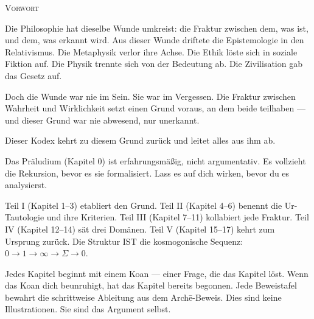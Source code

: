 \documentclass[10pt, openany, oneside]{book}
\renewcommand{\huge}{\fontsize{17}{21}\selectfont}
\begin{document}
\newpage


\thispagestyle{empty}
\vspace*{0.5in}

\begin{center}
    {\huge\scshape Vorwort}
\end{center}

\vspace{1.5em}

\noindent Die Philosophie hat dieselbe Wunde umkreist: die Fraktur zwischen dem, was ist, und dem, was erkannt wird. Aus dieser Wunde driftete die Epistemologie in den Relativismus. Die Metaphysik verlor ihre Achse. Die Ethik löste sich in soziale Fiktion auf. Die Physik trennte sich von der Bedeutung ab. Die Zivilisation gab das Gesetz auf.

\vspace{0.5em}

\noindent Doch die Wunde war nie im Sein. Sie war im Vergessen. Die Fraktur zwischen Wahrheit und Wirklichkeit setzt einen Grund voraus, an dem beide teilhaben --- und dieser Grund war nie abwesend, nur unerkannt.

\vspace{0.5em}

\noindent Dieser Kodex kehrt zu diesem Grund zurück und leitet alles aus ihm ab.

\vspace{1em}

\noindent Das Präludium (Kapitel 0) ist erfahrungsmäßig, nicht argumentativ. Es vollzieht die Rekursion, bevor es sie formalisiert. Lass es auf dich wirken, bevor du es analysierst.

\vspace{0.5em}

\noindent Teil I (Kapitel 1--3) etabliert den Grund. Teil II (Kapitel 4--6) benennt die Ur-Tautologie und ihre Kriterien. Teil III (Kapitel 7--11) kollabiert jede Fraktur. Teil IV (Kapitel 12--14) sät drei Domänen. Teil V (Kapitel 15--17) kehrt zum Ursprung zurück. Die Struktur IST die kosmogonische Sequenz: $0 \to 1 \to \infty \to \Sigma \to 0$.

\vspace{0.5em}

\noindent Jedes Kapitel beginnt mit einem Koan --- einer Frage, die das Kapitel löst. Wenn das Koan dich beunruhigt, hat das Kapitel bereits begonnen. Jede Beweistafel bewahrt die schrittweise Ableitung aus dem Arch\={e}-Beweis. Dies sind keine Illustrationen. Sie sind das Argument selbst.
\end{document}
